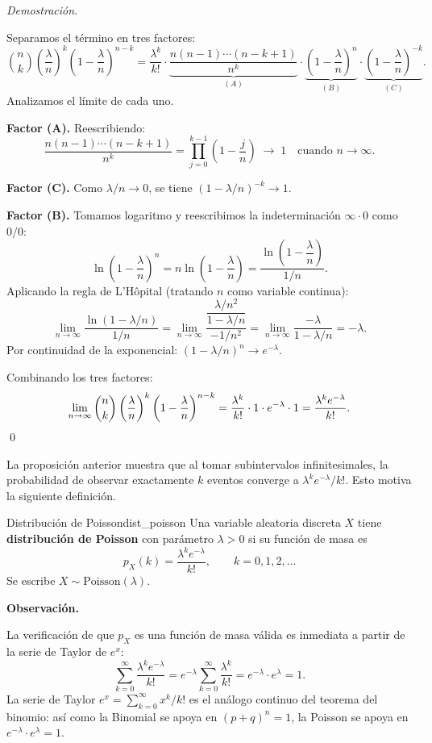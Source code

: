 \documentclass[12pt, a4paper]{book}
\newenvironment{observacion}{%
    \par\medskip\noindent\textbf{\color{azul}Observaci\'{o}n.}\enspace\itshape
}{\par\medskip}
\renewenvironment{proof}{%
    \par\medskip\noindent\textit{Demostraci\'{o}n.}\enspace
}{\qed\par\medskip}
\numberwithin{equation}{chapter}
\begin{document}
\begin{proof}
	Separamos el término en tres factores:
	\[
	\binom{n}{k}
	\left(\frac{\lambda}{n}\right)^k
	\left(1-\frac{\lambda}{n}\right)^{n-k}
	= \frac{\lambda^k}{k!}
	\cdot
	\underbrace{\frac{n(n-1)\cdots(n-k+1)}{n^k}}_{(A)}
	\cdot
	\underbrace{\left(1-\frac{\lambda}{n}\right)^{n}}_{(B)}
	\cdot
	\underbrace{\left(1-\frac{\lambda}{n}\right)^{-k}}_{(C)}.
	\]
	Analizamos el límite de cada uno.
	
	\textbf{Factor (A).} Reescribiendo:
	\[
	\frac{n(n-1)\cdots(n-k+1)}{n^k}
	= \prod_{j=0}^{k-1}\!\left(1-\frac{j}{n}\right) \;\to\; 1
	\quad\text{cuando } n\to\infty.
	\]
	
	\textbf{Factor (C).} Como $\lambda/n \to 0$, se tiene
	$\left(1-\lambda/n\right)^{-k} \to 1$.
	
	\textbf{Factor (B).} Tomamos logaritmo y reescribimos la
	indeterminación $\infty\cdot 0$ como $0/0$:
	\[
	\ln\!\left(1-\frac{\lambda}{n}\right)^{\!n}
	= n\ln\!\left(1-\frac{\lambda}{n}\right)
	= \frac{\ln\!\left(1-\dfrac{\lambda}{n}\right)}{1/n}.
	\]
	Aplicando la regla de L'H\^{o}pital (tratando $n$ como variable
	continua):
	\[
	\lim_{n\to\infty}
	\frac{\ln(1-\lambda/n)}{1/n}
	= \lim_{n\to\infty}
	\frac{\dfrac{\lambda/n^2}{1-\lambda/n}}{-1/n^2}
	= \lim_{n\to\infty}
	\frac{-\lambda}{1-\lambda/n} = -\lambda.
	\]
	Por continuidad de la exponencial:
	$\left(1-\lambda/n\right)^n \to e^{-\lambda}$.
	
	Combinando los tres factores:
	\[
	\lim_{n\to\infty}
	\binom{n}{k}
	\left(\frac{\lambda}{n}\right)^k
	\left(1-\frac{\lambda}{n}\right)^{n-k}
	= \frac{\lambda^k}{k!}\cdot 1 \cdot e^{-\lambda}\cdot 1
	= \frac{\lambda^k e^{-\lambda}}{k!}. \qedhere
	\]
\end{proof}

La proposición anterior muestra que al tomar subintervalos
infinitesimales, la probabilidad de observar exactamente $k$ eventos
converge a $\lambda^k e^{-\lambda}/k!$. Esto motiva la siguiente
definición.

\begin{definicion}{Distribuci\'{o}n de Poisson}{dist_poisson}
	Una variable aleatoria discreta $X$ tiene \textbf{distribución de
		Poisson} con parámetro $\lambda > 0$ si su función de masa es
	\[
	p_X(k) = \frac{\lambda^k e^{-\lambda}}{k!},
	\qquad k = 0, 1, 2, \ldots
	\]
	Se escribe $X \sim \mathrm{Poisson}(\lambda)$.
\end{definicion}

\begin{observacion}
	La verificación de que $p_X$ es una función de masa válida es
	inmediata a partir de la serie de Taylor de $e^x$:
	\[
	\sum_{k=0}^{\infty} \frac{\lambda^k e^{-\lambda}}{k!}
	= e^{-\lambda} \sum_{k=0}^{\infty} \frac{\lambda^k}{k!}
	= e^{-\lambda} \cdot e^{\lambda} = 1.
	\]
	La serie de Taylor $e^x = \sum_{k=0}^{\infty} x^k/k!$ es el
	análogo continuo del teorema del binomio: así como la Binomial
	se apoya en $(p+q)^n = 1$, la Poisson se apoya en
	$e^{-\lambda}\cdot e^{\lambda} = 1$.
\end{observacion}
\end{document}
